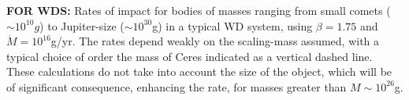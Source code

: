  {\bf FOR WDS:} Rates of impact for bodies of masses ranging from small comets ($\sim 10^{10}g$) to Jupiter-size ($\sim 10^{30}$g) in a typical WD system, using $\beta = 1.75$ and $\dot{M} = 10^{16}$g/yr.  The rates depend weakly on the scaling-mass assumed, with a typical choice of order the mass of Ceres indicated as a vertical dashed line.  These calculations do not take into account the size of the object, which will be of significant consequence, enhancing the rate, for masses greater than $M \sim 10^{26}$g.